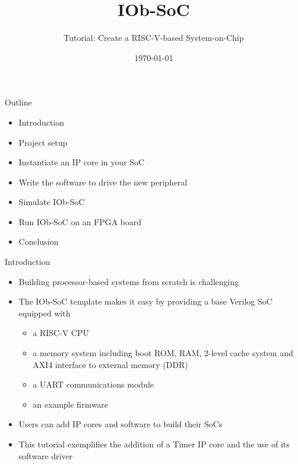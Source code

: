 \documentclass [xcolor=svgnames, t] {beamer}
\title[IOb-SoC Presentation]{IOb-SoC}
\subtitle{Tutorial: Create a RISC-V-based System-on-Chip}
\institute[IObundle Lda.]{IObundle Lda.}
\date{\today}
\begin{document}
\begin{frame}
 \titlepage   
\end{frame}


\begin{frame}{Outline}
\begin{center}
   \begin{itemize}
     \item Introduction
     \item Project setup
     \item Instantiate an IP core in your SoC
     \item Write the software to drive the new peripheral
     \item Simulate IOb-SoC
     \item Run IOb-SoC on an FPGA board
     \item Conclusion
 \end{itemize}
\end{center}
\end{frame}


\begin{frame}{Introduction}
\begin{center}
    \begin{itemize}
      \item Building processor-based systems from scratch is challenging
      \item The IOb-SoC template makes it easy by providing a base Verilog SoC equipped with
        \begin{itemize}
        \item a RISC-V CPU
        \item a memory system including boot ROM, RAM, 2-level cache system and AXI4 interface to external memory (DDR)
        \item a UART communications module
        \item an example firmware
        \end{itemize}
      \item Users can add IP cores and software to build their SoCs
      \item This tutorial exemplifies the addition of a Timer IP core and the use of its software driver
    \end{itemize}
\end{center}
\end{frame}
\end{document}
